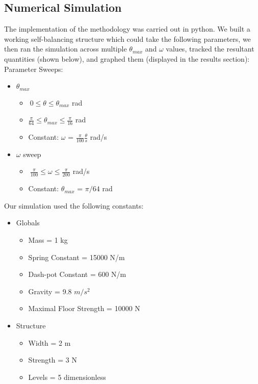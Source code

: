 \documentclass{article}
\begin{document}
\subsection{Numerical Simulation}
\begin{flushleft}
The implementation of the methodology was carried out in python. We built a working self-balancing structure which could take the following parameters, we then ran the simulation across multiple $\theta_{max}$ and $\omega$ values, tracked the resultant quantities (shown below), and graphed them (displayed in the results section): \newline
Parameter Sweeps: 
\begin{itemize}
    \item $\theta_{max}$
    \begin{itemize}
        \item $\ 0 \leq \theta \leq \theta_{max}$ rad
        \item $ \frac{\pi}{64} \leq \theta_{max} \leq \frac{\pi}{16} $ rad
        \item Constant: $\omega$ = $\frac{\pi}{100} \frac{\theta}{s}$ rad/s
    \end{itemize}
    \item $\omega$ sweep
    \begin{itemize}
        \item $\ \frac{\pi}{100} \leq \omega \leq \frac{\pi}{200}$ rad/s
        \item Constant: $\theta_{max}$ = $\pi/64$ rad
    \end{itemize}
\end{itemize}
Our simulation used the following constants: 
\begin{itemize}
    \item Globals
    \begin{itemize}
        \item Mass = 1 kg
        \item Spring Constant = 15000 N/m
        \item Dash-pot Constant = 600 N/m
        \item Gravity = 9.8 $m/s^2$
        \item Maximal Floor Strength = 10000 N
    \end{itemize}
    \item Structure
    \begin{itemize}
        \item Width = 2 m
        \item Strength = 3 N
        \item Levels = 5 dimensionless

\end{itemize}
\end{itemize}
\end{flushleft}
\end{document}
